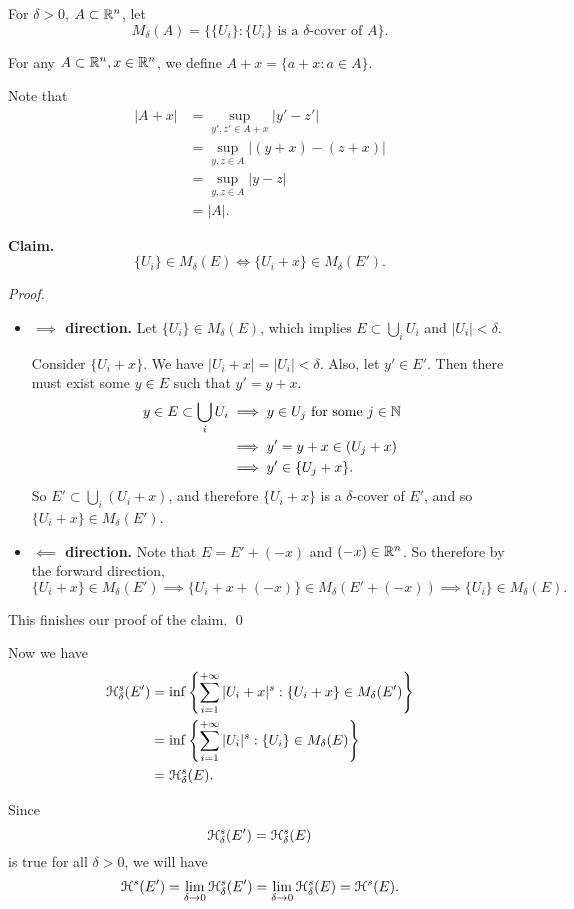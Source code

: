 For \(\delta > 0\), \(A \subset \mathbb{R}^n\), let
\[
M_\delta(A) = \{\{U_i\} : \{U_i\} \text{ is a } \delta\text{-cover of } A\}.
\]

For any \(A \subset \mathbb{R}^n, x \in \mathbb{R}^n\), we define \(A + x = \{a + x: a \in A\}\).

Note that
\begin{align*}
    |A + x| &= \sup_{y', z' \in A + x} |y' - z'|\\
    &= \sup_{y, z \in A} |(y + x) - (z + x)|\\
    &= \sup_{y, z \in A} |y - z|\\
    &= |A|.
\end{align*}

\textbf{Claim.}
\[
\{U_i\} \in M_{\delta}(E) \iff \{U_i + x\} \in M_{\delta}(E').
\]

\textit{Proof.}
\begin{itemize}
    \item \textbf{\(\implies\) direction.} Let \(\{U_i\} \in M_{\delta}(E)\), which implies \(E \subset \bigcup_i U_i\) and \(|U_i| < \delta\).

    Consider \(\{U_i + x\}\). We have \(|U_i + x| = |U_i| < \delta\). Also, let \(y' \in E'\). Then there must exist some \(y \in E\) such that \(y' = y + x\).
    \begin{align*}
        y \in E \subset \bigcup_i U_i &\implies y \in U_j \text{ for some } j \in \mathbb{N}\\
        &\implies y' = y + x \in \left(U_j + x\right)\\
        &\implies y' \in \{U_j + x\}.
    \end{align*}
    So \(E' \subset \bigcup_i (U_i + x)\), and therefore \(\{U_i + x\}\) is a \(\delta\)-cover of \(E'\), and so \(\{U_i + x\} \in M_{\delta}(E')\).
    \item \textbf{\(\impliedby\) direction.} Note that \(E = E' + (-x)\) and \((-x) \in \mathbb{R}^n\). So therefore by the forward direction,
    \[
        \{U_i + x\} \in M_{\delta}(E') \implies \{U_i + x + (-x)\} \in M_{\delta} (E' + (-x)) \implies \{U_i\} \in M_{\delta}(E).
    \]
\end{itemize}
This finishes our proof of the claim. \qed

Now we have
\begin{align*}
    \mathcal{H}_{\delta}^s (E') &= \inf\left\{\sum_{i = 1}^{+\infty} |U_i + x|^s : \{U_i + x\} \in M_{\delta} (E')\right\}\\
    &= \inf\left\{\sum_{i = 1}^{+\infty} |U_i|^s : \{U_i\} \in M_{\delta} (E)\right\}\\
    &= \mathcal{H}_{\delta}^s (E).
\end{align*}

Since \[\mathcal{H}_{\delta}^s (E') = \mathcal{H}_{\delta}^s (E)\] is true for all \(\delta > 0\), we will have
\[\mathcal{H}^s(E') = \lim_{\delta \to 0} \mathcal{H}_{\delta}^s (E') = \lim_{\delta \to 0} \mathcal{H}_{\delta}^s (E) = \mathcal{H}^s(E).\]